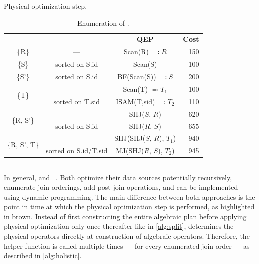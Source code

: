 \begin{table}[t]
    \vspace{.4cm}
    \begin{subtable}[b]{\columnwidth}
       \centering
       \caption{Physical optimization step.}
       \label{tbl:example-opt-split-phys}
       \begin{tabular}{|c!{\vrule width .8pt}c!{\vrule width .8pt}c!{\vrule width .8pt}r|}
          \hline
          \underline{} & \underline{} & \textbf{QEP} & \textbf{Cost} \\
          \{R\} & --- & Scan(R) $\eqcolon R$ & 150 \\
          \hline
          \{S\} & sorted on S.id & Scan(S) & 100 \\
          \hline
          \{S'\} & sorted on S.id & BF(Scan(S)) $\eqcolon S$ & 200 \\
          \hline
           & --- & Scan(T) $\eqcolon T_1$ & 100 \\
          & sorted on T.sid & ISAM(T,sid) $\eqcolon T_2$ & 110 \\
          \hline
           & --- & SHJ($S$, $R$) & 620 \\
          & sorted on S.id & SHJ($R$, $S$) & 655 \\
          \hline
           & --- & SHJ(SHJ($S$, $R$), $T_1$) & 940 \\
          & sorted on S.id/T.sid & MJ(SHJ($R$, $S$), $T_2$) & 945 \\
          \hline
       \end{tabular}
    \end{subtable}
    \vspace*{\captiongap}
    \caption{Enumeration of \split.}
    \label{tbl:example-opt-split}
\end{table}

\subsection{\holistic}
\label{sec:impl-holistic}

In general, \split and \holistic\ .  Both optimize their data sources potentially recursively, enumerate join orderings, add post-join operations, and can be implemented using dynamic programming.  The main difference between both approaches is the point in time at which the physical optimization step is performed, as highlighted in brown.  Instead of first constructing the entire algebraic plan before applying physical optimization only once thereafter like in \autoref{alg:split}, \holistic determines the physical operators directly at construction of algebraic operators.  Therefore, the helper function  is called multiple times ---  for every enumerated join order --- as described in \autoref{alg:holistic}.

